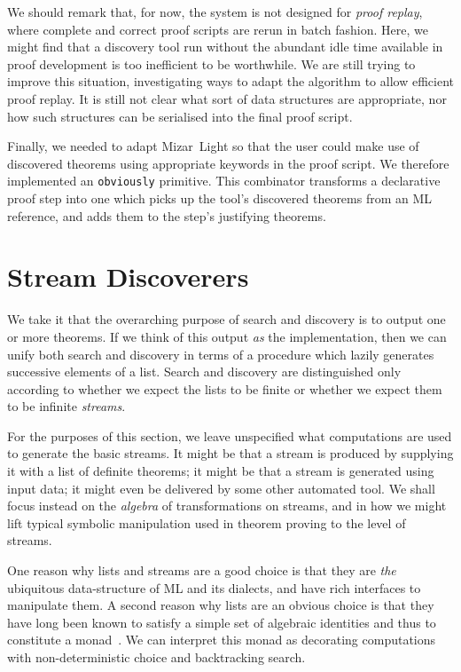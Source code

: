 We should remark that, for now, the system is not designed for \emph{proof replay}, where complete and correct proof scripts are rerun in batch fashion. Here, we might find that a discovery tool run without the abundant idle time available in proof development is too inefficient to be worthwhile. We are still trying to improve this situation, investigating ways to adapt the algorithm to allow efficient proof replay. It is still not clear what sort of data structures are appropriate, nor how such structures can be serialised into the final proof script.

Finally, we needed to adapt Mizar~Light so that the user could make use of discovered theorems using appropriate keywords in the proof script. We therefore implemented an \texttt{obviously} primitive. This combinator transforms a declarative proof step into one which picks up the tool's discovered theorems from an ML reference, and adds them to the step's justifying theorems. 

\section{Stream Discoverers}
We take it that the overarching purpose of search and discovery is to output one or more theorems. If we think of this output \emph{as} the implementation, then we can unify both search and discovery in terms of a procedure which lazily generates successive elements of a list. Search and discovery are distinguished only according to whether we expect the lists to be finite or whether we expect them to be infinite \emph{streams}. 

For the purposes of this section, we leave unspecified what computations are used to generate the basic streams. It might be that a stream is produced by supplying it with a list of definite theorems; it might be that a stream is generated using input data; it might even be delivered by some other automated tool. We shall focus instead on the \emph{algebra} of transformations on streams, and in how we might lift typical symbolic manipulation used in theorem proving to the level of streams.

One reason why lists and streams are a good choice is that they are \emph{the} ubiquitous data-structure of ML and its dialects, and have rich interfaces to manipulate them. A second reason why lists are an obvious choice is that they have long been known to satisfy a simple set of algebraic identities and thus to constitute a monad~\cite{MonadWadler}. We can interpret this monad as decorating computations with non-deterministic choice and backtracking search. 

